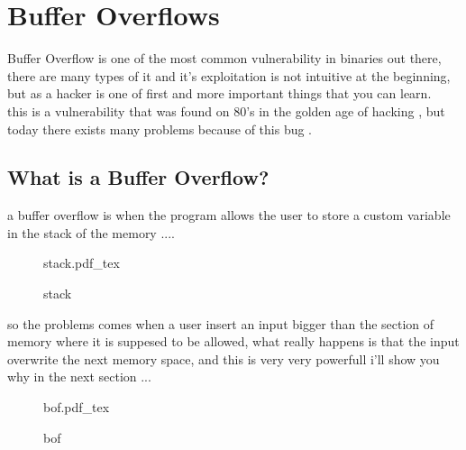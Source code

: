 \documentclass[10pt,a4paper]{article} %
\newcommand{\incfig}[1]{%
    \def\svgwidth{\columnwidth}
    {#1.pdf_tex}
}
\begin{document}
    \section{Buffer Overflows}

    Buffer Overflow is one of the most common vulnerability in binaries out
    there, there are many types of it and it's exploitation is not intuitive at
    the beginning, but as a hacker is one of first and more important things
    that you can learn.
    \\ this is a vulnerability that was found on 80's in the golden age of
    hacking , but today there exists many problems because of this bug .
    \subsection{What is a Buffer Overflow?}
        a buffer overflow is when the program allows the user to store a custom
        variable in the stack of the memory ....
        \begin{figure}[h!]
            \centering
            \incfig{stack}
            \caption{stack}
            \label{fig:stack}
        \end{figure}
        so the problems comes when a user insert an input bigger than the
        section of memory where it is suppesed to be allowed, what really
        happens is that the input overwrite the next memory space, and this is
        very very powerfull i'll show you why in the next section ...
        \begin{figure}[h!]
            \centering
            \incfig{bof}
            \caption{bof}
            \label{fig:bof}
        \end{figure}

        \newpage
\end{document}
